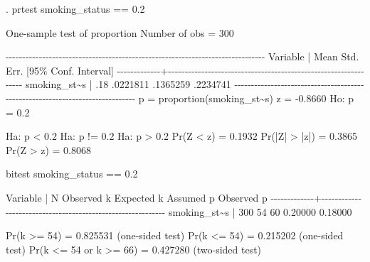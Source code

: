 \documentclass[
]{memoir}
\newenvironment{Shaded}{\begin{snugshade}}{\end{snugshade}}
\newcommand{\NormalTok}[1]{#1}
\begin{document}
\begin{Shaded}
\begin{Highlighting}[]
\NormalTok{. prtest smoking\_status == 0.2}

\NormalTok{One{-}sample test of proportion                   Number of obs      =       300}

\NormalTok{{-}{-}{-}{-}{-}{-}{-}{-}{-}{-}{-}{-}{-}{-}{-}{-}{-}{-}{-}{-}{-}{-}{-}{-}{-}{-}{-}{-}{-}{-}{-}{-}{-}{-}{-}{-}{-}{-}{-}{-}{-}{-}{-}{-}{-}{-}{-}{-}{-}{-}{-}{-}{-}{-}{-}{-}{-}{-}{-}{-}{-}{-}{-}{-}{-}{-}{-}{-}{-}{-}{-}{-}{-}{-}{-}{-}{-}{-}}
\NormalTok{    Variable |       Mean   Std. Err.                     [95\% Conf. Interval]}
\NormalTok{{-}{-}{-}{-}{-}{-}{-}{-}{-}{-}{-}{-}{-}+{-}{-}{-}{-}{-}{-}{-}{-}{-}{-}{-}{-}{-}{-}{-}{-}{-}{-}{-}{-}{-}{-}{-}{-}{-}{-}{-}{-}{-}{-}{-}{-}{-}{-}{-}{-}{-}{-}{-}{-}{-}{-}{-}{-}{-}{-}{-}{-}{-}{-}{-}{-}{-}{-}{-}{-}{-}{-}{-}{-}{-}{-}{-}{-}}
\NormalTok{smoking\_st\textasciitilde{}s |        .18   .0221811                      .1365259    .2234741}
\NormalTok{{-}{-}{-}{-}{-}{-}{-}{-}{-}{-}{-}{-}{-}{-}{-}{-}{-}{-}{-}{-}{-}{-}{-}{-}{-}{-}{-}{-}{-}{-}{-}{-}{-}{-}{-}{-}{-}{-}{-}{-}{-}{-}{-}{-}{-}{-}{-}{-}{-}{-}{-}{-}{-}{-}{-}{-}{-}{-}{-}{-}{-}{-}{-}{-}{-}{-}{-}{-}{-}{-}{-}{-}{-}{-}{-}{-}{-}{-}}
\NormalTok{    p = proportion(smoking\_st\textasciitilde{}s)                                  z =  {-}0.8660}
\NormalTok{Ho: p = 0.2}

\NormalTok{     Ha: p \textless{} 0.2                 Ha: p != 0.2                   Ha: p \textgreater{} 0.2}
\NormalTok{ Pr(Z \textless{} z) = 0.1932         Pr(|Z| \textgreater{} |z|) = 0.3865          Pr(Z \textgreater{} z) = 0.8068}

\NormalTok{bitest smoking\_status == 0.2}

\NormalTok{    Variable |        N   Observed k   Expected k   Assumed p   Observed p}
\NormalTok{{-}{-}{-}{-}{-}{-}{-}{-}{-}{-}{-}{-}{-}+{-}{-}{-}{-}{-}{-}{-}{-}{-}{-}{-}{-}{-}{-}{-}{-}{-}{-}{-}{-}{-}{-}{-}{-}{-}{-}{-}{-}{-}{-}{-}{-}{-}{-}{-}{-}{-}{-}{-}{-}{-}{-}{-}{-}{-}{-}{-}{-}{-}{-}{-}{-}{-}{-}{-}{-}{-}{-}{-}{-}}
\NormalTok{smoking\_st\textasciitilde{}s |      300         54           60       0.20000      0.18000}

\NormalTok{  Pr(k \textgreater{}= 54)            = 0.825531  (one{-}sided test)}
\NormalTok{  Pr(k \textless{}= 54)            = 0.215202  (one{-}sided test)}
\NormalTok{  Pr(k \textless{}= 54 or k \textgreater{}= 66) = 0.427280  (two{-}sided test)}
\end{Highlighting}
\end{Shaded}
\end{document}
